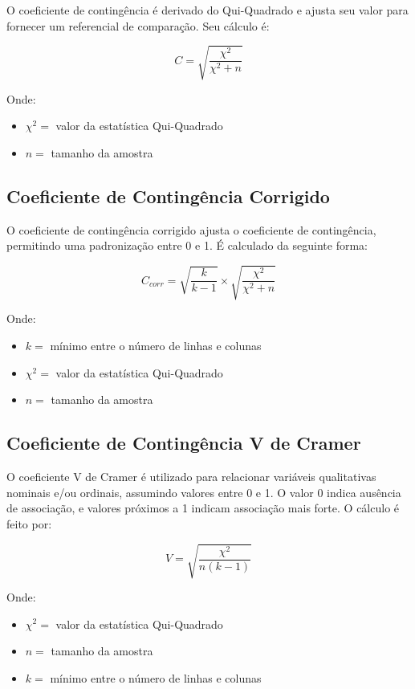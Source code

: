 \documentclass[
]{estat/estat}
\providecommand{\tightlist}{%
  \setlength{\itemsep}{0pt}\setlength{\parskip}{0pt}}\usepackage{longtable,booktabs,array}
\begin{document}
O coeficiente de contingência é derivado do Qui-Quadrado e ajusta seu
valor para fornecer um referencial de comparação. Seu cálculo é:

\[
C=\sqrt{\frac{\chi^2}{\chi^2+n}}
\]

Onde:

\begin{itemize}
\tightlist
\item
  \(\chi^2 =\) valor da estatística Qui-Quadrado
\item
  \(n =\) tamanho da amostra
\end{itemize}

\hypertarget{coeficiente-de-continguxeancia-corrigido}{%
\subsection{Coeficiente de Contingência
Corrigido}\label{coeficiente-de-continguxeancia-corrigido}}

O coeficiente de contingência corrigido ajusta o coeficiente de
contingência, permitindo uma padronização entre 0 e 1. É calculado da
seguinte forma:

\[
C_{corr}= \sqrt{\frac{k}{k-1}} \times \sqrt{\frac{\chi^2}{\chi^2 + n}}
\]

Onde:

\begin{itemize}
\tightlist
\item
  \(k =\) mínimo entre o número de linhas e colunas
\item
  \(\chi^2 =\) valor da estatística Qui-Quadrado
\item
  \(n =\) tamanho da amostra
\end{itemize}

\hypertarget{coeficiente-de-continguxeancia-v-de-cramer}{%
\subsection{Coeficiente de Contingência V de
Cramer}\label{coeficiente-de-continguxeancia-v-de-cramer}}

O coeficiente V de Cramer é utilizado para relacionar variáveis
qualitativas nominais e/ou ordinais, assumindo valores entre 0 e 1. O
valor 0 indica ausência de associação, e valores próximos a 1 indicam
associação mais forte. O cálculo é feito por:

\[
V = \sqrt{\frac{\chi^2}{n(k-1)}}
\]

Onde:

\begin{itemize}
\tightlist
\item
  \(\chi^2 =\) valor da estatística Qui-Quadrado
\item
  \(n =\) tamanho da amostra
\item
  \(k =\) mínimo entre o número de linhas e colunas
\end{itemize}
\end{document}
